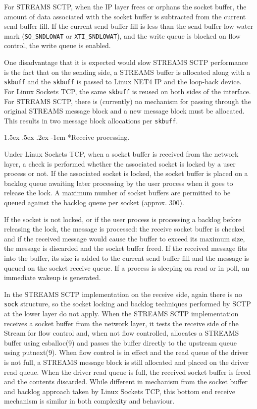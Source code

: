 \documentclass[letterpaper,final,notitlepage,twocolumn,10pt,twoside]{article}
\makeatletter
\renewcommand\paragraph{\@startsection{paragraph}{4}{\z@}%
                                    {1.5ex \@plus .5ex \@minus .2ex}%
                                    {-1em}%
                                    {\normalfont\normalsize\bfseries\slshape}}
\makeatother
\begin{document}
For STREAMS SCTP, when the IP layer frees or orphans the socket buffer, the amount of data
associated with the socket buffer is subtracted from the current send buffer fill.  If the current
send buffer fill is less than the send buffer low water mark (\texttt{SO\_SNDLOWAT} or
\texttt{XTI\_SNDLOWAT}), and the write queue is blocked on flow control, the write queue is enabled.

One disadvantage that it is expected would slow STREAMS SCTP performance is the fact that on the
sending side, a STREAMS buffer is allocated along with a \texttt{skbuff} and the \texttt{skbuff} is
passed to Linux NET4 IP and the loop-back device.  For Linux Sockets TCP, the same \texttt{skbuff}
is reused on both sides of the interface.  For STREAMS SCTP, there is (currently) no mechanism for
passing through the original STREAMS message block and a new message block must be allocated.  This
results in two message block allocations per \texttt{skbuff}.

\paragraph*{Receive processing.}

Under Linux Sockets TCP, when a socket buffer is received from the network layer, a check is
performed whether the associated socket is locked by a user process or not.  If the associated
socket is locked, the socket buffer is placed on a backlog queue awaiting later processing by the
user process when it goes to release the lock.  A maximum number of socket buffers are permitted to
be queued against the backlog queue per socket (approx. 300).

If the socket is not locked, or if the user process is processing a backlog before releasing the
lock, the message is processed: the receive socket buffer is checked and if the received message
would cause the buffer to exceed its maximum size, the message is discarded and the socket buffer
freed.  If the received message fits into the buffer, its size is added to the current send buffer
fill and the message is queued on the socket receive queue.  If a process is sleeping on read or in
poll, an immediate wakeup is generated.

In the STREAMS SCTP implementation on the receive side, again there is no \texttt{sock} structure,
so the socket locking and backlog techniques performed by SCTP at the lower layer do not apply.
When the STREAMS SCTP implementation receives a socket buffer from the network layer, it tests the
receive side of the Stream for flow control and, when not flow controlled, allocates a STREAMS
buffer using esballoc(9) and passes the buffer directly to the upstream queue using putnext(9).
When flow control is in effect and the read queue of the driver is not full, a STREAMS message block
is still allocated and placed on the driver read queue.  When the driver read queue is full, the
received socket buffer is freed and the contents discarded.  While different in mechanism from the
socket buffer and backlog approach taken by Linux Sockets TCP, this bottom end receive mechanism is
similar in both complexity and behaviour.
\end{document}
